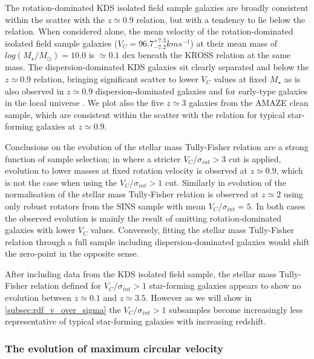 \documentclass[fleqn,usenatbib]{mn2e}
\begin{document}
The rotation-dominated KDS isolated field sample galaxies are broadly consistent within the scatter with the $z\simeq0.9$ relation, but with a tendency to lie below the relation.
When considered alone, the mean velocity of the rotation-dominated isolated field sample galaxies ($V_{C} = 96.7^{+7.3}_{-7.2}kms^{-1}$) at their mean mass of $log(M_{\star}/M_{\odot})=10.0$ is $\simeq0.1$ dex beneath the KROSS relation at the same mass.
The dispersion-dominated KDS galaxies sit clearly separated and below the $z\simeq0.9$ relation, bringing significant scatter to lower $V_{C}$ values at fixed $M_{\star}$ as is also observed in $z\simeq0.9$ dispersion-dominated galaxies and for early-type galaxies in the local universe \citep[e.g.][]{Romanowsky2012}. 
We plot also the five $z\simeq3$ galaxies from the AMAZE clean sample, which are consistent within the scatter with the relation for typical star-forming galaxies at $z\simeq0.9$.

Conclusions on the evolution of the stellar mass Tully-Fisher relation are a strong function of sample selection; in \cite{Tiley2016a} where a stricter $V_{C}/\sigma_{int} > 3$ cut is applied, evolution to lower masses at fixed rotation velocity is observed at $z\simeq0.9$, which is not the case when using the $V_{C}/\sigma_{int} > 1$ cut.
Similarly in \cite{Cresci2009} evolution of the normalisation of the stellar mass Tully-Fisher relation is observed at $z\simeq2$ using only robust rotators from the SINS sample with mean $V_{C}/\sigma_{int} = 5$.
In both cases the observed evolution is mainly the result of omitting rotation-dominated galaxies with lower $V_{C}$ values.
Conversely, fitting the stellar mass Tully-Fisher relation through a full sample including dispersion-dominated galaxies would shift the zero-point in the opposite sense.

After including data from the KDS isolated field sample, the stellar mass Tully-Fisher relation defined for $V_{C}/\sigma_{int} > 1$ star-forming galaxies appears to show no evolution between $z\simeq0.1$ and $z\simeq3.5$.
However as we will show in \cref{subsec:rdf_v_over_sigma} the $V_{C}/\sigma_{int} > 1$ subsamples become increasingly less representative of typical star-forming galaxies with increasing redshift.  

\subsubsection{The evolution of maximum circular velocity}\label{subsubsec:v_evolution}
\end{document}
